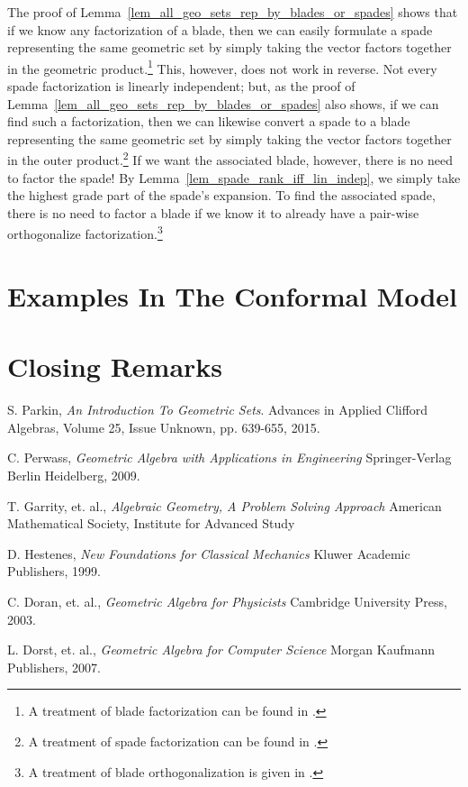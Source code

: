 \documentclass{birkjour}
\theoremstyle{definition}
\theoremstyle{remark}
\numberwithin{equation}{section}
\begin{document}
The proof of Lemma~\ref{lem_all_geo_sets_rep_by_blades_or_spades} shows that if we know
any factorization of a blade, then we can easily formulate a spade representing the same geometric set
by simply taking the vector factors together in the geometric product.\footnote{A treatment of blade factorization can be found in \cite[p. 533]{Dorst07}.}
This, however, does not work in reverse.  Not every spade factorization is linearly independent; but,
as the proof of Lemma~\ref{lem_all_geo_sets_rep_by_blades_or_spades} also shows, if we can find such a factorization, then we can likewise convert a spade
to a blade representing the same geometric set by simply taking the vector factors together in the outer product.\footnote{A treatment of spade factorization can be found in \cite[p. 107]{Perwass09}.}
If we want the associated blade, however, there is no need to factor the spade!
By Lemma~\ref{lem_spade_rank_iff_lin_indep}, we simply take the highest grade part of the spade's expansion.
To find the associated spade, there is no need to factor a blade if we know it to already have a pair-wise orthogonalize factorization.\footnote{A treatment of blade orthogonalization is given in \cite[p. 88]{Doran03}.}



\section{Examples In The Conformal Model}

\section{Closing Remarks}

\begin{thebibliography}{9}

S. Parkin,
\emph{An Introduction To Geometric Sets}.
Advances in Applied Clifford Algebras, Volume 25, Issue Unknown, pp. 639-655, 2015.

C. Perwass,
\emph{Geometric Algebra with Applications in Engineering}
Springer-Verlag Berlin Heidelberg, 2009.

T. Garrity, et. al.,
\emph{Algebraic Geometry, A Problem Solving Approach}
American Mathematical Society, Institute for Advanced Study

D. Hestenes,
\emph{New Foundations for Classical Mechanics}
Kluwer Academic Publishers, 1999.

C. Doran, et. al.,
\emph{Geometric Algebra for Physicists}
Cambridge University Press, 2003.

L. Dorst, et. al.,
\emph{Geometric Algebra for Computer Science}
Morgan Kaufmann Publishers, 2007.

\end{thebibliography}
\end{document}
